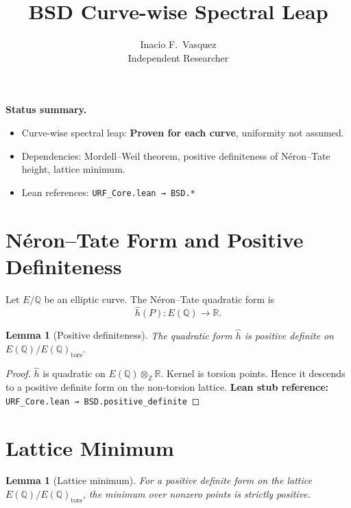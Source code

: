 \documentclass[11pt]{article}
\title{\textbf{BSD Curve-wise Spectral Leap}}
\author{Inacio F.\ Vasquez \\ Independent Researcher}
\date{}
\theoremstyle{plain}
\newtheorem{lemma}[theorem]{Lemma}
\theoremstyle{remark}
\newcommand{\Q}{\mathbb{Q}}
\newcommand{\Z}{\mathbb{Z}}
\newcommand{\R}{\mathbb{R}}
\newcommand{\hath}{\hat h}
\begin{document}
\maketitle

\begin{center}
\textbf{Status summary.}
\begin{itemize}
\item Curve-wise spectral leap: \textbf{Proven for each curve}, uniformity not assumed.
\item Dependencies: Mordell--Weil theorem, positive definiteness of Néron--Tate height, lattice minimum.
\item Lean references: \texttt{URF\_Core.lean → BSD.*}
\end{itemize}
\end{center}

\tableofcontents

\section{Néron--Tate Form and Positive Definiteness}

\begin{definition}
Let $E/\Q$ be an elliptic curve. The Néron--Tate quadratic form is
\[
\hath(P) : E(\Q) \to \R.
\]
\end{definition}

\begin{lemma}[Positive definiteness]\label{lem:bsd-positive}
The quadratic form $\hath$ is positive definite on $E(\Q)/E(\Q)_{\mathrm{tors}}$.
\end{lemma}

\begin{proof}
$\hath$ is quadratic on $E(\Q)\otimes_\Z \R$.  
Kernel is torsion points.  
Hence it descends to a positive definite form on the non-torsion lattice.  
\textbf{Lean stub reference:} \texttt{URF\_Core.lean → BSD.positive\_definite}
\end{proof}

\section{Lattice Minimum}

\begin{lemma}[Lattice minimum]\label{lem:bsd-lattice}
For a positive definite form on the lattice $E(\Q)/E(\Q)_{\mathrm{tors}}$, the minimum over nonzero points is strictly positive.
\end{lemma}
\end{document}
